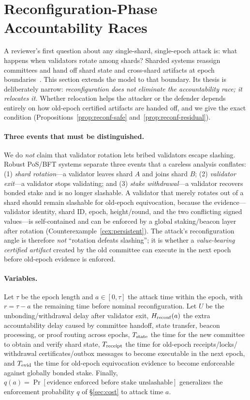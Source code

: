 \section{Reconfiguration-Phase Accountability Races}
\label{sec:reconf}

A reviewer's first question about any single-shard, single-epoch attack is: what happens when
validators rotate among shards? Sharded systems reassign committees and hand off shard state and
cross-shard artifacts at epoch boundaries~\cite{zamani2018rapidchain,kokoris2018omniledger}. This
section extends the model to that boundary. Its thesis is deliberately narrow:
\emph{reconfiguration does not eliminate the accountability race; it relocates it.} Whether
relocation helps the attacker or the defender depends entirely on how old-epoch certified artifacts
are handed off, and we give the exact condition (Propositions~\ref{prop:reconf-safe}
and~\ref{prop:reconf-residual}).

\paragraph{Three events that must be distinguished.}
We do \emph{not} claim that validator rotation lets bribed validators escape slashing. Robust
PoS/BFT systems separate three events that a careless analysis conflates:
(1) \emph{shard rotation}---a validator leaves shard $A$ and joins shard $B$;
(2) \emph{validator exit}---a validator stops validating; and
(3) \emph{stake withdrawal}---a validator recovers bonded stake and is no longer slashable.
A validator that merely rotates out of a shard should remain slashable for old-epoch equivocation,
because the evidence---validator identity, shard ID, epoch, height/round, and the two conflicting
signed values---is self-contained and can be enforced by a global staking/beacon layer after
rotation (Counterexample~\ref{cex:persistent}). The attack's reconfiguration angle is therefore
\emph{not} ``rotation defeats slashing''; it is whether a \emph{value-bearing certified artifact}
created by the old committee can execute in the next epoch before old-epoch evidence is enforced.

\paragraph{Variables.}
Let $\tau$ be the epoch length and $a\in[0,\tau]$ the attack time within the epoch, with
$r=\tau-a$ the remaining time before nominal reconfiguration. Let $U$ be the unbonding/withdrawal
delay after validator exit, $H_{\mathrm{reconf}}(a)$ the extra accountability delay caused by committee handoff,
state transfer, beacon processing, or proof routing across epochs, $T_{\mathrm{state}}$ the time for the new
committee to obtain and verify shard state, $T_{\mathrm{receipt}}$ the time for old-epoch receipts/locks/
withdrawal certificates/outbox messages to become executable in the next epoch, and $T_{\mathrm{evid}}$ the time
for old-epoch equivocation evidence to become enforceable against globally bonded stake. Finally,
$q(a)=\Pr[\text{evidence enforced before stake unslashable}]$ generalizes the enforcement
probability $q$ of \S\ref{sec:cost} to attack time $a$.

